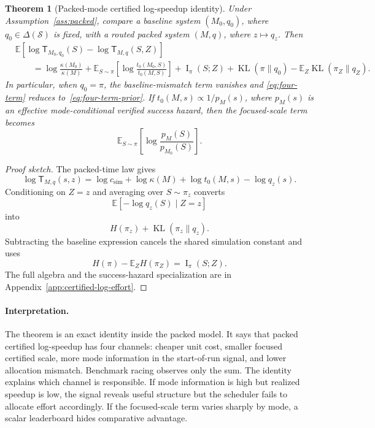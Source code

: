 \documentclass{article}
\newtheorem{theorem}{Theorem}
\DeclareMathOperator{\KL}{KL}
\DeclareMathOperator{\MI}{I}
\newcommand{\cS}{\mathcal{S}}
\newcommand{\E}{\mathbb{E}}
\begin{document}
\begin{theorem}[Packed-mode certified log-speedup identity]
\label{thm:four-term}
Under Assumption~\ref{ass:packed}, compare a baseline system \((M_0,q_0)\), where
\(q_0\in\Delta(\cS)\) is fixed, with a routed packed system \((M,q)\), where
\(z\mapsto q_z\).  Then
\begin{equation}
\label{eq:four-term}
\begin{aligned}
&\E\!\left[
    \log \mathsf T_{M_0,q_0}(S)
    -
    \log \mathsf T_{M,q}(S,Z)
\right]
\\
&\qquad =
\log\frac{\kappa(M_0)}{\kappa(M)}
+
\E_{S\sim\pi}
\left[
    \log\frac{t_0(M_0,S)}{t_0(M,S)}
\right]
+
\MI_\pi(S;Z)
+
\KL(\pi\|q_0)
-
\E_Z\KL(\pi_Z\|q_Z).
\end{aligned}
\end{equation}
In particular, when \(q_0=\pi\), the baseline-mismatch term vanishes and
\eqref{eq:four-term} reduces to~\eqref{eq:four-term-prior}.
If \(t_0(M,s)\propto 1/p_M(s)\), where \(p_M(s)\) is an effective mode-conditional
verified success hazard, then the focused-scale term becomes
\[
    \E_{S\sim\pi}
    \left[
        \log\frac{p_M(S)}{p_{M_0}(S)}
    \right].
\]
\end{theorem}

\begin{proof}[Proof sketch]
The packed-time law gives
\[
    \log \mathsf T_{M,q}(s,z)
    =
    \log c_{\mathrm{sim}}
    +
    \log\kappa(M)
    +
    \log t_0(M,s)
    -
    \log q_z(s).
\]
Conditioning on \(Z=z\) and averaging over \(S\sim\pi_z\) converts
\[
    \E[-\log q_z(S)\mid Z=z]
\]
into
\[
    H(\pi_z)+\KL(\pi_z\|q_z).
\]
Subtracting the baseline expression cancels the shared simulation constant and uses
\[
    H(\pi)-\E_ZH(\pi_Z)=\MI_\pi(S;Z).
\]
The full algebra and the success-hazard specialization are in
Appendix~\ref{app:certified-log-effort}.
\end{proof}

\paragraph{Interpretation.}
The theorem is an exact identity inside the packed model.  It says that packed certified
log-speedup has four channels: cheaper unit cost, smaller focused certified scale, more
mode information in the start-of-run signal, and lower allocation mismatch.  Benchmark
racing observes only the sum.  The identity explains which channel is responsible.  If mode
information is high but realized speedup is low, the signal reveals useful structure but the
scheduler fails to allocate effort accordingly.  If the focused-scale term varies sharply by
mode, a scalar leaderboard hides comparative advantage.
\end{document}
